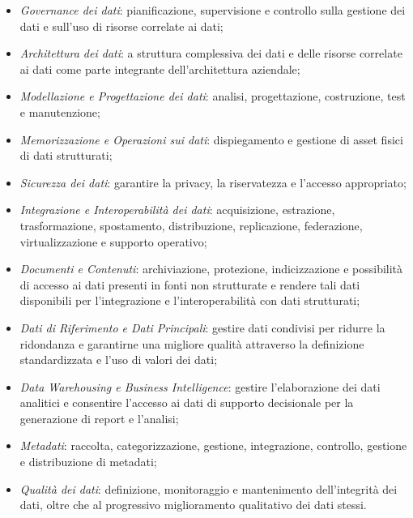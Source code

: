 \begin{itemize}
    \item \textit{Governance dei dati}: pianificazione, supervisione e controllo sulla gestione dei dati e sull'uso di risorse correlate ai dati;
    \item \textit{Architettura dei dati}: a struttura complessiva dei dati e delle risorse correlate ai dati come parte integrante dell'architettura aziendale;
    \item \textit{Modellazione e Progettazione dei dati}: analisi, progettazione, costruzione, test e manutenzione;
    \item \textit{Memorizzazione e Operazioni sui dati}: dispiegamento e gestione di asset fisici di dati strutturati;
    \item \textit{Sicurezza dei dati}: garantire la privacy, la riservatezza e l'accesso appropriato;
    \item \textit{Integrazione e Interoperabilità dei dati}: acquisizione, estrazione, trasformazione, spostamento, distribuzione, replicazione, federazione, virtualizzazione e supporto operativo;
    \item \textit{Documenti e Contenuti}: archiviazione, protezione, indicizzazione e possibilità di accesso ai dati presenti in fonti non strutturate e rendere tali dati disponibili per l'integrazione e l'interoperabilità con dati strutturati;
    \item \textit{Dati di Riferimento e Dati Principali}: gestire dati condivisi per ridurre la ridondanza e garantirne una migliore qualità attraverso la definizione standardizzata e l'uso di valori dei dati;
    \item \textit{Data Warehousing e Business Intelligence}: gestire l'elaborazione dei dati analitici e consentire l'accesso ai dati di supporto decisionale per la generazione di report e l'analisi;
    \item \textit{Metadati}: raccolta, categorizzazione, gestione, integrazione, controllo, gestione e distribuzione di metadati;
    \item \textit{Qualità dei dati}: definizione, monitoraggio e mantenimento dell'integrità dei dati, oltre che al progressivo miglioramento qualitativo dei dati stessi.
\end{itemize}

